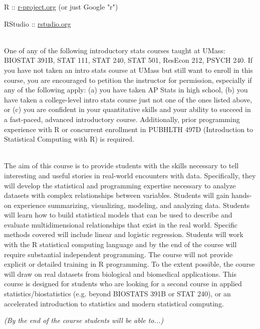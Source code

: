 \documentclass[10pt]{article}
\begin{document}

R :: \href{http://www.r-project.org}{r-project.org} (or just Google "r")

RStudio :: \href{http://www.rstudio.org}{rstudio.org}


\bigskip
{}\\
One of any of the following introductory stats courses taught at UMass: BIOSTAT 391B, STAT 111, STAT 240, STAT 501, ResEcon 212, PSYCH 240. If you have not taken an intro stats course at UMass but still want to enroll in this course, you are encouraged to petition the instructor for permission, especially if any of the following apply: (a) you have taken AP Stats in high school, (b) you have taken a college-level intro stats course just not one of the ones listed above, or (c) you are confident in your quantitative skills and your ability to succeed in a fast-paced, advanced introductory course. Additionally, prior programming experience with R or concurrent enrollment in PUBHLTH 497D (Introduction to Statistical Computing with R) is required.


\bigskip
{}\\ 
The aim of this course is to provide students with the skills necessary to tell interesting and useful stories in real-world encounters with data. Specifically, they will develop the statistical and programming expertise necessary to analyze datasets with complex relationships between variables. Students will gain hands-on experience summarizing, visualizing, modeling, and analyzing data. Students will learn how to build statistical models that can be used to describe and evaluate multidimensional relationships that exist in the real world. Specific methods covered will include linear and logistic regression. Students will work with the R statistical computing language and by the end of the course will require substantial independent programming. The course will not provide explicit or detailed training in R programming. To the extent possible, the course will draw on real datasets from biological and biomedical applications. This course is designed for students who are looking for a second course in applied statistics/biostatistics (e.g. beyond BIOSTATS 391B or STAT 240), or an accelerated introduction to statistics and modern statistical computing.


\bigskip
{} {\em (By the end of the course students will be able to...)}
\end{document}
